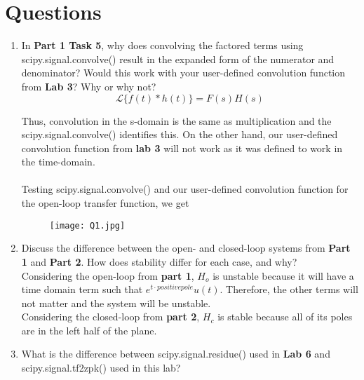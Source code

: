 \documentclass[12pt,a4paper]{article}
\begin{document}
\section{Questions}\label{sec:res}
\begin{enumerate}
    
    \item
    In \textbf{Part 1 Task 5}, why does convolving the factored terms using scipy.signal.convolve() result in the expanded form of the numerator and denominator? Would this work with your user-defined convolution function from \textbf{Lab 3}? Why or why not?\\
    
    $$\mathcal{L}\{f(t)*h(t)\} = F(s)H(s)$$
    
    Thus, convolution in the s-domain is the same as multiplication and the scipy.signal.convolve() identifies this. On the other hand, our user-defined convolution function from \textbf{lab 3} will not work as it was defined to work in the time-domain.\\\\
    Testing scipy.signal.convolve() and our user-defined convolution function for the open-loop transfer function, we get
   
\begin{figure}[h]
    \centering
    \texttt{[image: Q1.jpg]}
\end{figure}\textbf{}

    \item
    Discuss the difference between the open- and closed-loop systems from \textbf{Part 1} and \textbf{Part 2}. How does stability differ for each case, and why?\\
    
    Considering the open-loop from \textbf{part 1}, $H_{o}$ is unstable because it will have a time domain term such that $e^{t\cdot positive pole} u(t)$. Therefore, the other terms will not matter and the system will be unstable.\\
    
    Considering the closed-loop from \textbf{part 2}, $H_{c}$ is stable because all of its poles are in the left half of the plane.\\
    
    \item
    What is the difference between scipy.signal.residue() used in \textbf{Lab 6} and
    scipy.signal.tf2zpk() used in this lab?\\
    

\end{enumerate}
\end{document}
